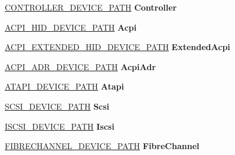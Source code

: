 \begin{DoxyCompactItemize}
\hyperlink{struct_c_o_n_t_r_o_l_l_e_r___d_e_v_i_c_e___p_a_t_h}{C\+O\+N\+T\+R\+O\+L\+L\+E\+R\+\_\+\+D\+E\+V\+I\+C\+E\+\_\+\+P\+A\+TH} {\bfseries Controller}
\item 
\mbox{\label{union_e_f_i___d_e_v___p_a_t_h_a935dc6286cb3c8aa9f4318a19681bcf9}} 
\hyperlink{struct_a_c_p_i___h_i_d___d_e_v_i_c_e___p_a_t_h}{A\+C\+P\+I\+\_\+\+H\+I\+D\+\_\+\+D\+E\+V\+I\+C\+E\+\_\+\+P\+A\+TH} {\bfseries Acpi}
\item 
\mbox{\label{union_e_f_i___d_e_v___p_a_t_h_a6c1b1b5b558251091145e8bdfdcc9868}} 
\hyperlink{struct_a_c_p_i___e_x_t_e_n_d_e_d___h_i_d___d_e_v_i_c_e___p_a_t_h}{A\+C\+P\+I\+\_\+\+E\+X\+T\+E\+N\+D\+E\+D\+\_\+\+H\+I\+D\+\_\+\+D\+E\+V\+I\+C\+E\+\_\+\+P\+A\+TH} {\bfseries Extended\+Acpi}
\item 
\mbox{\label{union_e_f_i___d_e_v___p_a_t_h_ace44ca067ec422118780b9bcd0e87e80}} 
\hyperlink{struct_a_c_p_i___a_d_r___d_e_v_i_c_e___p_a_t_h}{A\+C\+P\+I\+\_\+\+A\+D\+R\+\_\+\+D\+E\+V\+I\+C\+E\+\_\+\+P\+A\+TH} {\bfseries Acpi\+Adr}
\item 
\mbox{\label{union_e_f_i___d_e_v___p_a_t_h_a6e71864a9aad262f7512cf784daf942d}} 
\hyperlink{struct_a_t_a_p_i___d_e_v_i_c_e___p_a_t_h}{A\+T\+A\+P\+I\+\_\+\+D\+E\+V\+I\+C\+E\+\_\+\+P\+A\+TH} {\bfseries Atapi}
\item 
\mbox{\label{union_e_f_i___d_e_v___p_a_t_h_ab363211280d6dd74607fcc353d9a54b8}} 
\hyperlink{struct_s_c_s_i___d_e_v_i_c_e___p_a_t_h}{S\+C\+S\+I\+\_\+\+D\+E\+V\+I\+C\+E\+\_\+\+P\+A\+TH} {\bfseries Scsi}
\item 
\mbox{\label{union_e_f_i___d_e_v___p_a_t_h_a26adcbb932f23653b573b301e34912ec}} 
\hyperlink{struct_i_s_c_s_i___d_e_v_i_c_e___p_a_t_h}{I\+S\+C\+S\+I\+\_\+\+D\+E\+V\+I\+C\+E\+\_\+\+P\+A\+TH} {\bfseries Iscsi}
\item 
\mbox{\label{union_e_f_i___d_e_v___p_a_t_h_a2bc60a20169328fdb861bc722e61d33d}} 
\hyperlink{struct_f_i_b_r_e_c_h_a_n_n_e_l___d_e_v_i_c_e___p_a_t_h}{F\+I\+B\+R\+E\+C\+H\+A\+N\+N\+E\+L\+\_\+\+D\+E\+V\+I\+C\+E\+\_\+\+P\+A\+TH} {\bfseries Fibre\+Channel}

\end{DoxyCompactItemize}
